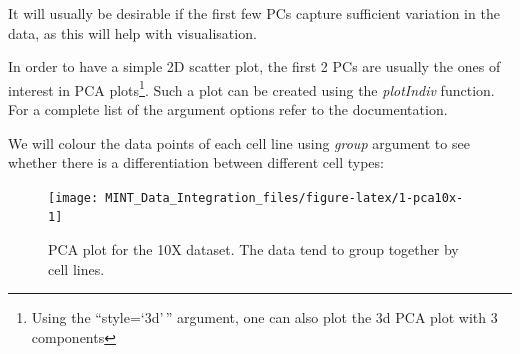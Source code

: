 \documentclass[]{book}
\newenvironment{Shaded}{\begin{snugshade}}{\end{snugshade}}
\newcommand{\CommentTok}[1]{\textcolor[rgb]{0.56,0.35,0.01}{\textit{#1}}}
\newcommand{\DataTypeTok}[1]{\textcolor[rgb]{0.13,0.29,0.53}{#1}}
\newcommand{\DecValTok}[1]{\textcolor[rgb]{0.00,0.00,0.81}{#1}}
\newcommand{\FloatTok}[1]{\textcolor[rgb]{0.00,0.00,0.81}{#1}}
\newcommand{\KeywordTok}[1]{\textcolor[rgb]{0.13,0.29,0.53}{\textbf{#1}}}
\newcommand{\NormalTok}[1]{#1}
\newcommand{\OperatorTok}[1]{\textcolor[rgb]{0.81,0.36,0.00}{\textbf{#1}}}
\newcommand{\OtherTok}[1]{\textcolor[rgb]{0.56,0.35,0.01}{#1}}
\newcommand{\StringTok}[1]{\textcolor[rgb]{0.31,0.60,0.02}{#1}}
\let\rmarkdownfootnote\footnote%
\def\footnote{\protect\rmarkdownfootnote}
\theoremstyle{definition}
\theoremstyle{definition}
\theoremstyle{definition}
\theoremstyle{remark}
\begin{document}
It will usually be desirable if the first few PCs capture sufficient
variation in the data, as this will help with visualisation.

In order to have a simple 2D scatter plot, the first 2 PCs are usually
the ones of interest in PCA plots\footnote{Using the ``style=`3d'\,''
  argument, one can also plot the 3d PCA plot with 3 components}. Such a
plot can be created using the \emph{plotIndiv} function. For a complete
list of the argument options refer to the documentation.

We will colour the data points of each cell line using \emph{group}
argument to see whether there is a differentiation between different
cell types:

\begin{Shaded}
\end{Shaded}

\begin{Shaded}
\end{Shaded}

\begin{figure}[ht]

{\centering \texttt{[image: MINT\_Data\_Integration\_files/figure-latex/1-pca10x-1]} 

}

\caption{PCA plot for the 10X dataset. The data tend to group together by cell lines.}\label{fig:1-pca10x}
\end{figure}
\end{document}
